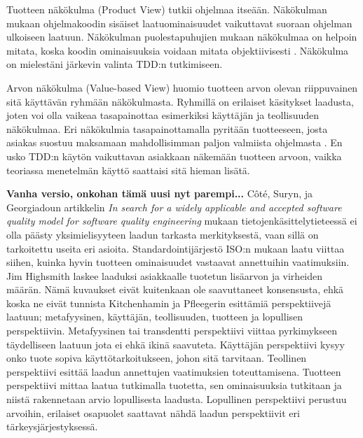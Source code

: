 \documentclass[finnish]{tktltiki2}
\theoremstyle{definition}
\theoremstyle{remark}
\begin{document}
Tuotteen näkökulma (Product View) tutkii ohjelmaa itseään. Näkökulman mukaan ohjelmakoodin sisäiset laatuominaisuudet vaikuttavat suoraan ohjelman ulkoiseen laatuun. Näkökulman puolestapuhujien mukaan näkökulmaa on helpoin mitata, koska koodin ominaisuuksia voidaan mitata objektiivisesti \cite{Kitchenham96}. Näkökulma on mielestäni järkevin valinta TDD:n tutkimiseen.

Arvon näkökulma (Value-based View) huomio tuotteen arvon olevan riippuvainen sitä käyttävän ryhmään näkökulmasta. Ryhmillä on erilaiset käsitykset laadusta, joten voi olla vaikeaa tasapainottaa esimerkiksi käyttäjän ja teollisuuden näkökulmaa. Eri näkökulmia tasapainottamalla pyritään tuotteeseen, josta asiakas suostuu maksamaan mahdollisimman paljon valmiista ohjelmasta \cite{Kitchenham96}. En usko TDD:n käytön vaikuttavan asiakkaan näkemään tuotteen arvoon, vaikka teoriassa menetelmän käyttö saattaisi sitä hieman lisätä.













\textbf{Vanha versio, onkohan tämä uusi nyt parempi...}
Côté,  Suryn, ja Georgiadoun artikkelin \emph{In search for a widely applicable and accepted software quality model for software quality engineering}  mukaan tietojenkäsittelytieteessä ei olla päästy yksimielisyyteen laadun tarkasta merkityksestä, vaan sillä on tarkoitettu useita eri asioita. Standardointijärjestö ISO:n mukaan laatu viittaa siihen, kuinka hyvin tuotteen ominaisuudet vastaavat annettuihin vaatimuksiin. Jim Highsmith laskee laaduksi asiakkaalle tuotetun lisäarvon %
 ja virheiden määrän. Nämä kuvaukset eivät kuitenkaan ole saavuttaneet konsensusta, ehkä koska ne eivät tunnista Kitchenhamin ja Pfleegerin esittämiä perspektiivejä laatuun; metafyysinen, käyttäjän, teollisuuden, tuotteen ja lopullisen perspektiivin. Metafyysinen tai transdentti perspektiivi viittaa pyrkimykseen täydelliseen laatuun jota ei ehkä ikinä saavuteta. Käyttäjän perspektiivi kysyy onko tuote sopiva käyttötarkoitukseen, johon sitä tarvitaan. Teollinen perspektiivi esittää laadun annettujen vaatimuksien toteuttamisena. Tuotteen perspektiivi mittaa laatua tutkimalla tuotetta, sen ominaisuuksia tutkitaan ja niistä rakennetaan arvio lopullisesta laadusta. Lopullinen perspektiivi perustuu arvoihin, erilaiset osapuolet saattavat nähdä laadun perspektiivit eri tärkeysjärjestyksessä. \cite{Cote07}
\end{document}
